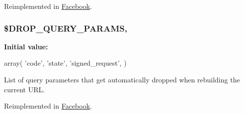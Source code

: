 Reimplemented in \hyperlink{class_facebook_a3d9af40cffd892f8e26b26464188297d}{Facebook}.

\hypertarget{class_base_facebook_a4a197673d978b05709df6e2240e545c6}{
\subsubsection[{\$\-D\-R\-O\-P\-\_\-\-Q\-U\-E\-R\-Y\-\_\-\-P\-A\-R\-A\-M\-S}]{\setlength{\rightskip}{0pt plus 5cm}\$D\-R\-O\-P\-\_\-\-Q\-U\-E\-R\-Y\-\_\-\-P\-A\-R\-A\-M\-S\hspace{0.3cm}{\ttfamily [static]}, {\ttfamily [protected]}}}\label{class_base_facebook_a4a197673d978b05709df6e2240e545c6}
{\bfseries Initial value\-:}
\begin{DoxyCode}
 array(
    \textcolor{stringliteral}{'code'},
    \textcolor{stringliteral}{'state'},
    \textcolor{stringliteral}{'signed\_request'},
  )
\end{DoxyCode}
List of query parameters that get automatically dropped when rebuilding the current U\-R\-L. 

Reimplemented in \hyperlink{class_facebook_a4a197673d978b05709df6e2240e545c6}{Facebook}.

